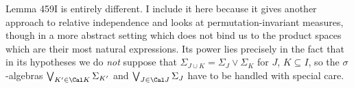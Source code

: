 {Lemma 459I is entirely different.   I include it here because it gives
another approach to relative independence and looks at
permutation-invariant measures, though in a more abstract setting which
does not bind us to the product spaces which are their most natural
expressions.   Its power lies precisely in the fact that in its hypotheses
we do {\it not} suppose that
$\Sigma_{J\cup K}=\Sigma_J\vee\Sigma_K$ for $J$, $K\subseteq I$, so the
$\sigma$-algebras $\bigvee_{K'\in\Cal K}\Sigma_{K'}$ and
$\bigvee_{J\in\Cal J}\Sigma_J$ have to be handled with special care.
}%


\discrpage


